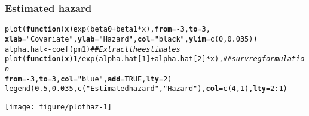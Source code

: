 \documentclass[color=usenames,dvipsnames]{beamer}\usepackage[]{graphicx}\usepackage[]{xcolor}
\makeatletter
\newcommand{\hlnum}[1]{\textcolor[rgb]{0.69,0.494,0}{#1}}%
\newcommand{\hlsng}[1]{\textcolor[rgb]{0.749,0.012,0.012}{#1}}%
\newcommand{\hlcom}[1]{\textcolor[rgb]{0.514,0.506,0.514}{\textit{#1}}}%
\newcommand{\hlopt}[1]{\textcolor[rgb]{0,0,0}{#1}}%
\newcommand{\hldef}[1]{\textcolor[rgb]{0,0,0}{#1}}%
\newcommand{\hlkwa}[1]{\textcolor[rgb]{0,0,0}{\textbf{#1}}}%
\newcommand{\hlkwb}[1]{\textcolor[rgb]{0,0.341,0.682}{#1}}%
\newcommand{\hlkwc}[1]{\textcolor[rgb]{0,0,0}{\textbf{#1}}}%
\newcommand{\hlkwd}[1]{\textcolor[rgb]{0.004,0.004,0.506}{#1}}%
\newenvironment{kframe}{%
 \def\at@end@of@kframe{}%
 \ifinner\ifhmode%
  \def\at@end@of@kframe{\end{minipage}}%
  \begin{minipage}{\columnwidth}%
 \fi\fi%
 \def\FrameCommand##1{\hskip\@totalleftmargin \hskip-\fboxsep
 \colorbox{shadecolor}{##1}\hskip-\fboxsep
     \hskip-\linewidth \hskip-\@totalleftmargin \hskip\columnwidth}%
 \MakeFramed {\advance\hsize-\width
   \@totalleftmargin\z@ \linewidth\hsize
   \@setminipage}}%
 {\par\unskip\endMakeFramed%
 \at@end@of@kframe}
\newenvironment{knitrout}{}{} %
\makeatother
\begin{document}
\begin{frame}[fragile]
  \frametitle{Estimated hazard}
\begin{knitrout}\scriptsize
{}\color{fgcolor}\begin{kframe}
\begin{alltt}
\hlkwd{plot}\hldef{(}\hlkwa{function}\hldef{(}\hlkwc{x}\hldef{)} \hlkwd{exp}\hldef{(beta0} \hlopt{+} \hldef{beta1}\hlopt{*}\hldef{x),} \hlkwc{from}\hldef{=}\hlopt{-}\hlnum{3}\hldef{,} \hlkwc{to}\hldef{=}\hlnum{3}\hldef{,}
     \hlkwc{xlab}\hldef{=}\hlsng{"Covariate"}\hldef{,} \hlkwc{ylab}\hldef{=}\hlsng{"Hazard"}\hldef{,} \hlkwc{col}\hldef{=}\hlsng{"black"}\hldef{,} \hlkwc{ylim}\hldef{=}\hlkwd{c}\hldef{(}\hlnum{0}\hldef{,} \hlnum{0.035}\hldef{))}
\hldef{alpha.hat} \hlkwb{<-} \hlkwd{coef}\hldef{(pm1)}   \hlcom{## Extract the estimates}
\hlkwd{plot}\hldef{(}\hlkwa{function}\hldef{(}\hlkwc{x}\hldef{)} \hlnum{1}\hlopt{/}\hlkwd{exp}\hldef{(alpha.hat[}\hlnum{1}\hldef{]} \hlopt{+} \hldef{alpha.hat[}\hlnum{2}\hldef{]}\hlopt{*}\hldef{x),} \hlcom{## survreg formulation}
     \hlkwc{from}\hldef{=}\hlopt{-}\hlnum{3}\hldef{,} \hlkwc{to}\hldef{=}\hlnum{3}\hldef{,} \hlkwc{col}\hldef{=}\hlsng{"blue"}\hldef{,} \hlkwc{add}\hldef{=}\hlnum{TRUE}\hldef{,} \hlkwc{lty}\hldef{=}\hlnum{2}\hldef{)}
\hlkwd{legend}\hldef{(}\hlnum{0.5}\hldef{,} \hlnum{0.035}\hldef{,} \hlkwd{c}\hldef{(}\hlsng{"Estimated hazard"}\hldef{,} \hlsng{"Hazard"}\hldef{),} \hlkwc{col}\hldef{=}\hlkwd{c}\hldef{(}\hlnum{4}\hldef{,}\hlnum{1}\hldef{),} \hlkwc{lty}\hldef{=}\hlnum{2}\hlopt{:}\hlnum{1}\hldef{)}
\end{alltt}
\end{kframe}

{\centering \texttt{[image: figure/plothaz-1]} 

}


\end{knitrout}
\end{frame}
\end{document}

